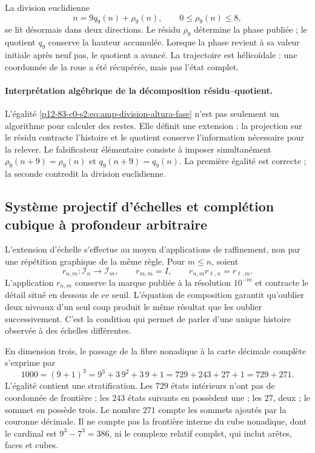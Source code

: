 La division euclidienne
\begin{equation}\label{p12-83-c0-s2:eq:amp-division-altura-fase}
 n=9q_9(n)+\rho_9(n),
 \qquad 0\leq\rho_9(n)\leq8,
\end{equation}
se lit désormais dans deux directions. Le résidu \(\rho_9\) détermine la phase
publiée ; le quotient \(q_9\) conserve la hauteur accumulée. Lorsque la phase
revient à sa valeur initiale après neuf pas, le quotient a avancé.
La trajectoire est hélicoïdale : une coordonnée de la roue a été récupérée,
mais pas l'état complet.

\paragraph{Interprétation algébrique de la décomposition résidu–quotient.}
L'égalité \eqref{p12-83-c0-s2:eq:amp-division-altura-fase} n'est pas seulement un algorithme pour
calculer des restes. Elle définit une extension : la projection sur le résidu contracte
l'histoire et le quotient conserve l'information nécessaire pour la relever.
Le falsificateur élémentaire consiste à imposer simultanément
\(\rho_9(n+9)=\rho_9(n)\) et \(q_9(n+9)=q_9(n)\). La première égalité est
correcte ; la seconde contredit la division euclidienne.

\subsection{Système projectif d'échelles et complétion cubique à profondeur arbitraire}

L'extension d'échelle s'effectue au moyen d'applications de raffinement, non par une
répétition graphique de la même règle. Pour \(m\leq n\), soient
\begin{equation}\label{p12-83-c0-s2:eq:amp-refinamiento-escalas}
 r_{n,m}:\mathcal I_n\longrightarrow\mathcal I_m,
 \qquad
 r_{m,m}=I,
 \qquad
 r_{n,m}r_{\ell,n}=r_{\ell,m}.
\end{equation}
L'application \(r_{n,m}\) conserve la marque publiée à la résolution \(10^{-m}\) et
contracte le détail situé en dessous de ce seuil. L'équation de
composition garantit qu'oublier deux niveaux d'un seul coup produit le même
résultat que les oublier successivement. C'est la condition qui permet
de parler d'une unique histoire observée à des échelles différentes.

En dimension trois, le passage de la fibre nonadique à la carte décimale complète
s'exprime par
\begin{equation}\label{p12-83-c0-s2:eq:amp-729-271-1000}
 1000=(9+1)^3=9^3+3\,9^2+3\,9+1
 =729+243+27+1=729+271.
\end{equation}
L'égalité contient une stratification. Les \(729\) états intérieurs
n'ont pas de coordonnée de frontière ; les \(243\) états suivants en possèdent une ;
les \(27\), deux ; le sommet en possède trois. Le nombre \(271\) compte les sommets
ajoutés par la couronne décimale. Il ne compte pas la frontière interne du cube
nonadique, dont le cardinal est \(9^3-7^3=386\), ni le complexe relatif complet,
qui inclut arêtes, faces et cubes.

